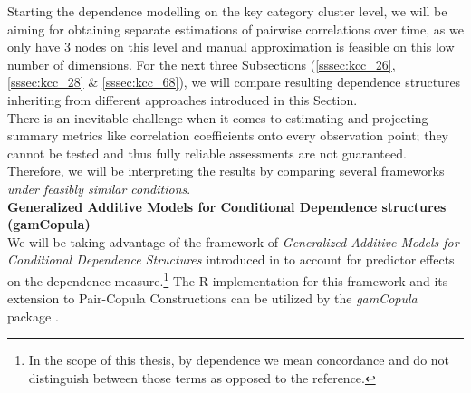 
Starting the dependence modelling on the key category cluster level, we will be aiming for obtaining separate estimations of pairwise correlations over time, as we only have 3 nodes on this level and manual approximation is feasible on this low number of dimensions. %
For the next three Subsections (\ref{sssec:kcc_26}, \ref{sssec:kcc_28} \& \ref{sssec:kcc_68}), we will compare resulting dependence structures inheriting from different approaches introduced in this Section.\\

There is an inevitable challenge when it comes to estimating and projecting summary metrics like correlation coefficients onto every observation point; they cannot be tested and thus fully reliable assessments are not guaranteed. Therefore, we will be interpreting the results by comparing several frameworks \textit{under feasibly similar conditions}.\\


\textbf{Generalized Additive Models for Conditional Dependence structures (gamCopula)}\\
We will be taking advantage of the framework of \textit{Generalized Additive Models for Conditional Dependence Structures} introduced in \cite{vatter2015generalized} to account for predictor effects on the dependence measure.\footnote{In the scope of this thesis, by dependence we mean concordance and do not distinguish between those terms as opposed to the reference.} The R implementation for this framework and its extension to Pair-Copula Constructions \citep{vatter2018generalized} can be utilized by the \textit{gamCopula} package \citep{vatter2019gamcopula}. \\


